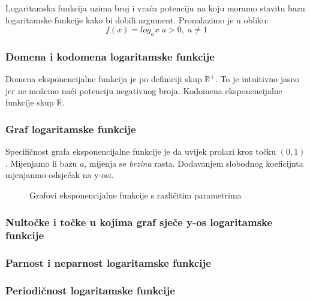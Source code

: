 \newcommand{\loga}{logaritamske funkcije}
Logaritamska funkcija uzima broj i vraća potenciju na koju moramo stavitu bazu logaritamske funkcije kako bi dobili argument.
Pronalazimo je u obliku:
\[f(x) = log_ax\;a > 0,\; a \neq 1\]

\subsubsection{Domena i kodomena \loga}
    Domena eksponencijalne funkcija je po definiciji skup \(\mathbb{R^+}\).
    To je intuitivno jasno jer ne možemo naći potenciju negativnog broja.
    Kodomena eksponencijalne funkcije skup \(\mathbb{R}\).

\subsubsection{Graf \loga}
    Specifičnost grafa eksponencijalne funkcije je da uvijek prolazi kroz točku \((0, 1)\).
    Mijenjamo li bazu \(a\), mijenja se \emph{brzina} rasta. Dodavanjem slobodnog koeficijnta mjenjanmo odsječak na y-osi.
    \begin{figure}[ht]
        \centering
        \caption{Grafovi eksponencijalne funkcije s različitim parametrima}
        \label{fig:template}
    \end{figure}
\subsubsection{Nultočke i točke u kojima graf sječe y-os \loga}
\subsubsection{Parnost i neparnost \loga}
\subsubsection{Periodičnost \loga}
